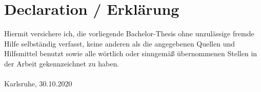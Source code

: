 
\chapter*{Declaration / Erkl\"arung}
Hiermit versichere ich, die vorliegende Bachelor-Thesis ohne unzulässige fremde Hilfe selbständig verfasst, keine anderen als die angegebenen Quellen und Hilfsmittel benutzt sowie alle wörtlich oder sinngemäß übernommenen Stellen in der Arbeit gekennzeichnet zu haben.\\

\vspace{2cm}
\myname \\
Karlsruhe, 30.10.2020\\
